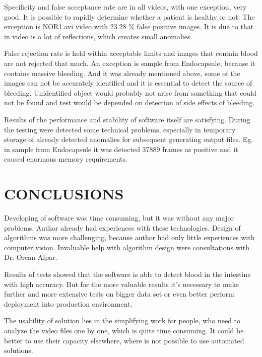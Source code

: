 \documentclass[twoside]{article}
\begin{document}
\begin{multicols}{2}
Specificity and false acceptance rate are in all videos, with one exception, very good. It is possible to rapidly determine whether a patient is healthy or not. The exception is NOR1.avi video with 23.28 \% false positive images. It is due to that in video is a lot of reflections, which creates small anomalies.

False rejection rate is held within acceptable limits and images that contain blood are not rejected that much. An exception is sample from Endocapsule, because it contains massive bleeding. And it was already mentioned above, some of the images can not be accurately identified and it is essential to detect the source of bleeding. Unidentified object would probably not arise from something that could not be found and test would be depended on detection of side effects of bleeding.

Results of the performance and stability of software itself are satisfying. During the testing were detected some technical problems, especially in temporary storage of already detected anomalies for subsequent generating output files. Eg. in sample from Endocapsule it was detected 37889 frames as positive and it caused enormous memory requirements.

\section{CONCLUSIONS}
Developing of software was time consuming, but it was without any major problems. Author already had experiences with these technologies. Design of algorithms was more challenging, because author had only little experiences with computer vision. Invaluable help with algorithm design were consultations with Dr. Orcan Alpar.

Results of tests showed that the software is able to detect blood in the intestine with high accuracy. But for the more valuable results it's necessary to make further and more extensive tests on bigger data set or even better perform deployment into production environment.

The usability of solution lies in the simplifying work for people, who need to analyze the video files one by one, which is quite time consuming. It could be better to use their capacity elsewhere, where is not possible to use automated solutions.



\printbibliography

\end{multicols}
\end{document}
